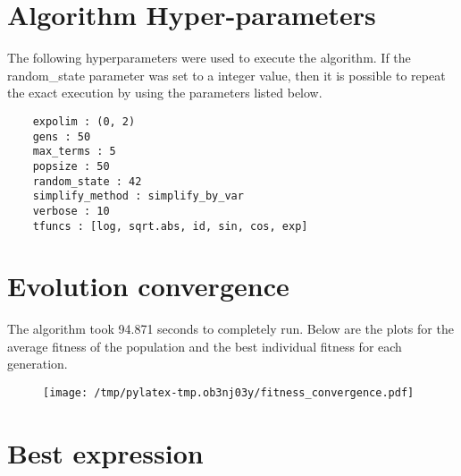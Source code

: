 \documentclass{article}%
\begin{document}
%
\vfill \pagebreak

%
\section*{Algorithm Hyper-parameters}%
\label{sec:AlgorithmHyper{-}parameters}%

                The following hyperparameters were used to execute the
                algorithm. If the random\_state parameter was set to a 
                integer value, then it is possible to repeat the exact
                execution by using the parameters listed below.%
{\footnotesize \begin{verbatim}    expolim : (0, 2)
    gens : 50
    max_terms : 5
    popsize : 50
    random_state : 42
    simplify_method : simplify_by_var
    verbose : 10
    tfuncs : [log, sqrt.abs, id, sin, cos, exp]\end{verbatim} } \vfill \pagebreak

%

            \chead{}
            \rhead{\today, \currenttime}
            
            \lfoot{}
            \cfoot{}
            \rfoot{\thepage\ | \pageref{LastPage}}
\section*{Evolution convergence}%
\label{sec:Evolutionconvergence}%

                The algorithm took 94.871 seconds to
                completely run. Below are the plots for the average fitness
                of the population and the best individual fitness for each
                generation.\vfill%


\begin{figure}[H]%
\centering%
\texttt{[image: /tmp/pylatex-tmp.ob3nj03y/fitness\_convergence.pdf]}%
\end{figure}

%
\vfill \pagebreak

%
\section*{Best expression}%
\label{sec:Bestexpression}%
\end{document}
